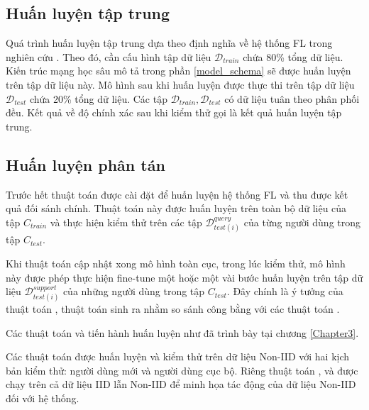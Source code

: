 \subsection{Huấn luyện tập trung}

Quá trình huấn luyện tập trung dựa theo định nghĩa về hệ thống FL trong nghiên cứu \cite{yin2021comprehensive}. Theo đó, cần cấu hình tập dữ liệu $\mathcal{D}_{train}$ chứa 80\% tổng dữ liệu. Kiến trúc mạng học sâu mô tả trong phần \ref{model_schema} sẽ được huấn luyện trên tập dữ liệu này. Mô hình sau khi huấn luyện được thực thi trên tập dữ liệu $\mathcal{D}_{test}$ chứa 20\% tổng dữ liệu. Các tập $\mathcal{D}_{train}, \mathcal{D}_{test}$ có dữ liệu tuân theo phân phối đều. Kết quả về độ chính xác sau khi kiểm thử gọi là kết quả huấn luyện tập trung.

\subsection{Huấn luyện phân tán}

Trước hết thuật toán  được cài đặt để huấn luyện hệ thống FL và thu được kết quả đối sánh chính. Thuật toán này được huấn luyện trên toàn bộ dữ liệu của tập $C_{train}$ và thực hiện kiểm thử trên các tập $\mathcal{D}_{test(i)}^{query}$ của từng người dùng trong tập $C_{test}$.

Khi thuật toán  cập nhật xong mô hình toàn cục, trong lúc kiểm thử, mô hình này được phép thực hiện fine-tune một hoặc một vài bước huấn luyện trên tập dữ liệu $\mathcal{D}_{test(i)}^{support}$ của những người dùng trong tập $C_{test}$. Đây chính là ý tưởng của thuật toán , thuật toán sinh ra nhằm so sánh công bằng với các thuật toán .

Các thuật toán  và  tiến hành huấn luyện như đã trình bày tại chương \ref{Chapter3}.


Các thuật toán được huấn luyện và kiểm thử trên dữ liệu Non-IID với hai kịch bản kiểm thử: người dùng mới và người dùng cục bộ. Riêng thuật toán ,  và  được chạy trên cả dữ liệu IID lẫn Non-IID để minh họa tác động của dữ liệu Non-IID đối với hệ thống.

